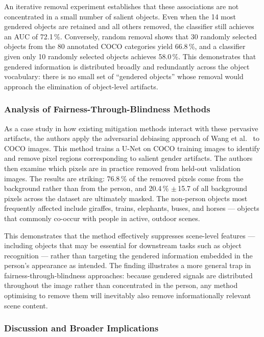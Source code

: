 An iterative removal experiment establishes that these associations are not concentrated in a
small number of salient objects.  Even when the 14 most gendered objects are retained and
all others removed, the classifier still achieves an AUC of 72.1\,\%.  Conversely, random
removal shows that 30 randomly selected objects from the 80 annotated COCO categories yield
66.8\,\%, and a classifier given only 10 randomly selected objects achieves 58.0\,\%.  This
demonstrates that gendered information is distributed broadly and redundantly across the
object vocabulary: there is no small set of ``gendered objects'' whose removal would approach
the elimination of object-level artifacts.

\subsubsection*{Analysis of Fairness-Through-Blindness Methods}

As a case study in how existing mitigation methods interact with these pervasive artifacts,
the authors apply the adversarial debiasing approach of Wang et
al.~\cite{Wang_2019_BalancedDatasets} to COCO images.  This method trains a U-Net on COCO
training images to identify and remove pixel regions corresponding to salient gender
artifacts.  The authors then examine which pixels are in practice removed from held-out
validation images.  The results are striking: 76.8\,\% of the removed pixels come from the
background rather than from the person, and 20.4\,\% $\pm$\,15.7 of all background pixels
across the dataset are ultimately masked.  The non-person objects most frequently affected
include giraffes, trains, elephants, buses, and horses --- objects that commonly co-occur
with people in active, outdoor scenes.

This demonstrates that the method effectively suppresses scene-level features --- including
objects that may be essential for downstream tasks such as object recognition --- rather than
targeting the gendered information embedded in the person's appearance as intended.  The
finding illustrates a more general trap in fairness-through-blindness approaches: because
gendered signals are distributed throughout the image rather than concentrated in the person,
any method optimising to remove them will inevitably also remove informationally relevant
scene content.

\subsubsection*{Discussion and Broader Implications}

